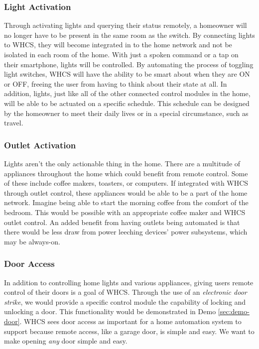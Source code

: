 \subsubsection{Light Activation}
Through activating lights and querying their status remotely, a homeowner will
no longer have to be present in the same room as the switch.  By connecting
lights to WHCS, they will become integrated in to the home network and not be
isolated in each room of the home.  With just a spoken command or a tap on
their smartphone, lights will be controlled.  By automating the process of
toggling light switches, WHCS will have the ability to be smart about when they
are ON or OFF, freeing the user from having to think about their state at all.
In addition, lights, just like all of the other connected control modules in
the home, will be able to be actuated on a specific schedule. This schedule
 can be designed by the homeowner
to meet their daily lives or in a special circumstance, such as travel.

\subsubsection{Outlet Activation}
Lights aren't the only actionable thing in the home. There are a multitude of
appliances throughout the home which could benefit from remote control. Some
of these include coffee makers, toasters, or computers. If integrated with WHCS through outlet control, these appliances
would be able to be a part of the home network. Imagine being able to start the
morning coffee from the comfort of the bedroom. This would be possible with an
appropriate coffee maker and WHCS outlet control. An added benefit from having
outlets being automated is that there would be less draw from power leeching
devices' power subsystems, which may be always-on. 

\subsubsection{Door Access}
In addition to controlling home lights and various appliances, giving users
remote control of their doors is  a goal of WHCS. Through the use of an
\emph{electronic door strike}, we would provide a specific control module the
capability of locking and unlocking a door. This functionality would be
demonstrated in Demo \ref{sec:demo-door}. WHCS sees door access as important
for a home automation system to support because remote access, like a garage
door, is simple and easy. We want to make opening \emph{any} door simple and
easy.

